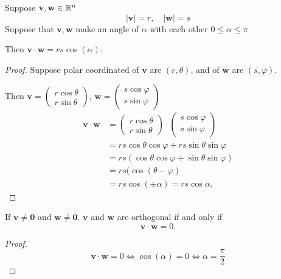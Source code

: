 \documentclass[10pt, a4paper]{article}
\newcommand{\mbf}[1]{\mathbf{#1}}
\begin{document}
\begin{proposition}
    Suppose $\mbf{v}, \mbf{w} \in \R ^ n$
    \[
    |\mbf{v}| = r,\quad|\mbf{w}| = s
    \]
    Suppose that $\mbf{v}, \mbf{w}$ make an angle of $\alpha$ with each other $0 \leq \alpha \leq \pi$
    
    Then $\mbf{v}\cdot\mbf{w} = rs\cos(\alpha)$.
    \begin{proof}
        Suppose polar coordinated of $\mbf{v}$ are $(r, \theta)$, and of $\mbf{w}$ are $(s, \varphi)$.

        Then $\mbf{v} = \begin{pmatrix}
            r\cos\theta \\
            r\sin\theta
        \end{pmatrix}$, $\mbf{w} = \begin{pmatrix}
            s\cos\varphi \\
            s\sin\varphi
        \end{pmatrix}$
        \begin{align*}
        \mbf{v\cdot w} &= \begin{pmatrix}
            r\cos\theta \\
            r\sin\theta
        \end{pmatrix} \cdot \begin{pmatrix}
            s\cos\varphi \\
            s\sin\varphi
        \end{pmatrix} \\
        &= rs\cos\theta\cos\varphi + rs\sin\theta\sin\varphi \\
        &= rs(\cos\theta\cos\varphi + \sin\theta\sin\varphi) \\
        &= rs(\cos(\theta - \varphi) \\
        &= rs\cos(\pm\alpha) = rs\cos\alpha.
        \end{align*}
    \end{proof}
\end{proposition}

\begin{corollary}
    If $\mbf{v} \neq \mbf{0}$ and $\mbf{w} \neq \mbf{0}$.
    $\mbf{v}$ and $\mbf{w}$ are orthogonal if and only if
    \[
    \mbf{v \cdot w} = 0.
    \]
    \begin{proof}
        \[
        \mbf{v \cdot w} = 0 \iff \cos(\alpha) = 0 \iff \alpha = \frac{\pi}{2}
        \]
    \end{proof}
\end{corollary}
\end{document}
